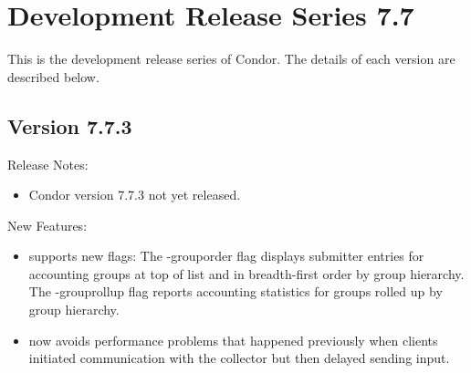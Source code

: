 
\section{\label{sec:History-7-7}Development Release Series 7.7}

This is the development release series of Condor.
The details of each version are described below.


\subsection*{\label{sec:New-7-7-3}Version 7.7.3}

\noindent Release Notes:

\begin{itemize}

\item Condor version 7.7.3 not yet released.

\end{itemize}


\noindent New Features:

\begin{itemize}

\item {} supports new flags: The -grouporder flag displays submitter 
entries for accounting groups at top of list and in breadth-first order by group 
hierarchy. The -grouprollup flag reports accounting statistics for groups rolled up
by group hierarchy.

\item {} now avoids performance problems that happened
previously when clients initiated communication with the collector but
then delayed sending input.

\end{itemize}

